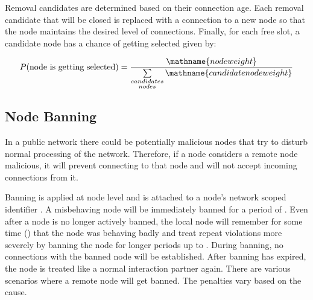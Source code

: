 Removal candidates are determined based on their connection age.
Each removal candidate that will be closed is replaced with a connection to a new node so that the node maintains the desired level of connections.
Finally, for each free slot, a candidate node has a chance of getting selected given by:

\begin{align*}
	P(\textrm{node is getting selected}) = \frac{\mathname{node weight}}{\sum\limits_{\substack{candidates\\nodes}} \mathname{candidate node weight}}
\end{align*}

\subsection{Node Banning}
\label{sec:reputation:NodeBanning}

In a public network there could be potentially malicious nodes that try to disturb normal processing of the network.
Therefore, if a node considers a remote node malicious, it will prevent connecting to that node and will not accept incoming connections from it.

Banning is applied at node level and is attached to a node's network scoped identifier .
A misbehaving node will be immediately banned for a period of .
Even after a node is no longer actively banned, the local node will remember for some time () that the node was behaving badly and treat repeat violations more severely by banning the node for longer periods up to .
During banning, no connections with the banned node will be established.
After banning has expired, the node is treated like a normal interaction partner again.
There are various scenarios where a remote node will get banned.
The penalties vary based on the cause.

